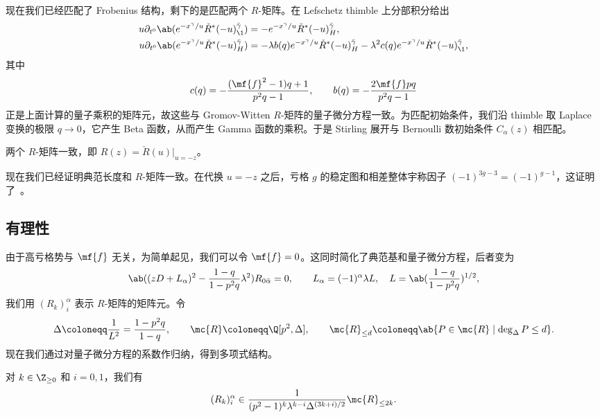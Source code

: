 现在我们已经匹配了 Frobenius 结构，剩下的是匹配两个 \(R\)-矩阵。在 Lefschetz thimble 上分部积分给出
\begin{align*}
    u \partial_{t^0}\ab(e^{-x^{\gamma}/u}\check{R}^*(-u)^{\bar{\gamma}}_{\1}) &= -e^{-x^{\gamma}/u}\check{R}^*(-u)^{\bar{\gamma}}_H, \\
    u\partial_{t^0}\ab(e^{-x^{\gamma}/u}\check{R}^*(-u)^{\bar{\gamma}}_H) &= -\lambda b(q)e^{-x^{\gamma}/u}\check{R}^*(-u)^{\bar{\gamma}}_H - \lambda^2 c(q) e^{-x^{\gamma}/u}\check{R}^*(-u)^{\bar{\gamma}}_{\1},
\end{align*}
其中
\[ c(q) = -\frac{(\mf{f}^2-1)q+1}{p^2q-1}, \qquad b(q) = -\frac{2\mf{f}pq}{p^2q-1} \]
正是上面计算的量子乘积的矩阵元，故这些与 Gromov-Witten \(R\)-矩阵的量子微分方程一致。为匹配初始条件，我们沿 thimble 取 Laplace 变换的极限 \(q \to 0\)，它产生 Beta 函数，从而产生 Gamma 函数的乘积。于是 Stirling 展开与 Bernoulli 数初始条件 \(C_{\alpha}(z)\) 相匹配。

\begin{prop}%
\label{prop:R matrices coincide}
    两个 \(R\)-矩阵一致，即 \(R(z) = \check{R}(u)|_{u=-z}\)。
\end{prop}

现在我们已经证明典范长度和 \(R\)-矩阵一致。在代换 \(u = -z\) 之后，亏格 \(g\) 的稳定图和相差整体宇称因子 \((-1)^{3g-3} = (-1)^{g-1}\)，这证明了~。

\subsection{有理性}%
\label{sub:Rationality}

由于高亏格势与 \(\mf{f}\) 无关，为简单起见，我们可以令 \(\mf{f} = 0\)。这同时简化了典范基和量子微分方程，后者变为
\[ \ab((zD+L_{\alpha})^2 - \frac{1-q}{1-p^2q}\lambda^2)R_{0\bar{\alpha}} = 0, \qquad L_{\alpha} = (-1)^{\alpha}\lambda L, \quad L = \ab(\frac{1-q}{1-p^2q})^{1/2}, \]
我们用 \((R_k)_i^{\alpha}\) 表示 \(R\)-矩阵的矩阵元。令
\[ \Delta \coloneqq \frac{1}{L^2} = \frac{1-p^2q}{1-q}, \qquad \mc{R} \coloneqq \Q[p^2,\Delta], \qquad \mc{R}_{\leq d} \coloneqq \ab\{P \in \mc{R} \mid \deg_{\Delta} P \leq d\}. \]
现在我们通过对量子微分方程的系数作归纳，得到多项式结构。

\begin{prop}%
\label{prop:R matrix polynomiality}
    对 \(k \in \Z_{\geq0}\) 和 \(i = 0,1\)，我们有
    \[ (R_k)_i^{\alpha} \in \frac{1}{(p^2-1)^k \lambda^{k-i}\Delta^{(3k+i)/2}}\mc{R}_{\leq 2k}. \]
\end{prop}

